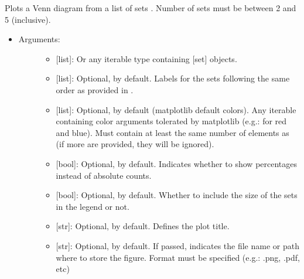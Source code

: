 \documentclass[letterpaper,10pt,english]{sphinxmanual}
\begin{document}
\begin{fulllineitems}
\label{\detokenize{plots:data_tools.plots.venn}}
Plots a Venn diagram from a list of sets . Number of sets must be
between 2 and 5 (inclusive).
\begin{itemize}
\item {} \begin{description}
\item[{Arguments:}] \leavevmode\begin{itemize}
\item {} 
 {[}list{]}: Or any iterable type containing {[}set{]} objects.

\item {} 
 {[}list{]}: Optional, \sphinxcode{\sphinxupquote{{[}'A', 'B', 'C', 'D', 'E'{]}}} by
default. Labels for the sets following the same order as
provided in .

\item {} 
 {[}list{]}: Optional, \sphinxcode{\sphinxupquote{{[}'C0', 'C1' 'C2', 'C3', 'C4'{]}}} by
default (matplotlib default colors). Any iterable containing
color arguments tolerated by matplotlib (e.g.: \sphinxcode{\sphinxupquote{{[}'r', 'b'{]}}}
for red and blue). Must contain at least the same number of
elements as  (if more are provided, they will be ignored).

\item {} 
 {[}bool{]}: Optional,  by default. Indicates
whether to show percentages instead of absolute counts.

\item {} 
 {[}bool{]}: Optional,  by default. Whether to
include the size of the sets in the legend or not.

\item {} 
 {[}str{]}: Optional,  by default. Defines the plot
title.

\item {} 
 {[}str{]}: Optional,  by default. If passed,
indicates the file name or path where to store the figure.
Format must be specified (e.g.: .png, .pdf, etc)


\end{itemize}
\end{description}
\end{itemize}
\end{fulllineitems}
\end{document}
